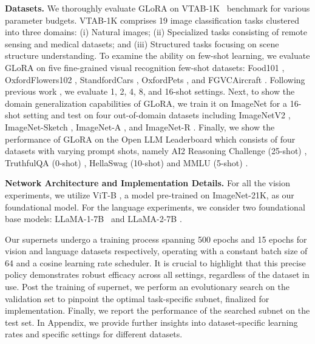 {\bf Datasets.} We thoroughly evaluate GLoRA on VTAB-1K~\citep{zhai2020the} benchmark for various parameter budgets. VTAB-1K comprises 19 image classification tasks clustered into three domains: (i) Natural images; (ii) Specialized tasks consisting of remote sensing and medical datasets; and (iii) Structured tasks focusing on scene structure understanding. To examine the ability on few-shot learning, we evaluate GLoRA on five fine-grained visual recognition few-shot datasets: Food101 \citep{bossard14}, OxfordFlowers102 \citep{nilsback2006visual}, StandfordCars \citep{krause20133d}, OxfordPets \citep{parkhi2012cats}, and FGVCAircraft \citep{maji2013fine}. Following previous work \citep{jie2022fact}, we evaluate 1, 2, 4, 8, and 16-shot settings. Next, to show the domain generalization capabilities of GLoRA, we train it on ImageNet \citep{deng2009imagenet} for a 16-shot setting and test on four out-of-domain datasets including ImageNetV2 \citep{recht2019imagenet}, ImageNet-Sketch \citep{wang2019learning}, ImageNet-A \citep{hendrycks2021natural}, and ImageNet-R \citep{hendrycks2021many}. Finally, we show the performance of GLoRA on the Open LLM Leaderboard which consists of four datasets with varying prompt shots, namely AI2 Reasoning Challenge (25-shot) \citep{clark2018think}, TruthfulQA (0-shot) \citep{truthful}, HellaSwag (10-shot) \citep{zellers-etal-2019-hellaswag} and MMLU (5-shot) \citep{hendrycks2020measuring}.

{\bf Network Architecture and Implementation Details.} For all the vision experiments, we utilize ViT-B \citep{dosovitskiyimage}, a model pre-trained on ImageNet-21K, as our foundational model. For the language experiments, we consider two foundational base models: LLaMA-1-7B~\citep{touvron2023llama} and LLaMA-2-7B \citep{touvron2023llama2}.

Our supernets undergo a training process spanning 500 epochs and 15 epochs for vision and language datasets respectively, operating with a constant batch size of 64 and a cosine learning rate scheduler. It is crucial to highlight that this precise policy demonstrates robust efficacy across all settings, regardless of the dataset in use. Post the training of supernet, we perform an evolutionary search on the validation set to pinpoint the optimal task-specific subnet, finalized for implementation. Finally, we report the performance of the searched subnet on the test set. In Appendix, we provide further insights into dataset-specific learning rates and specific settings for different datasets.

